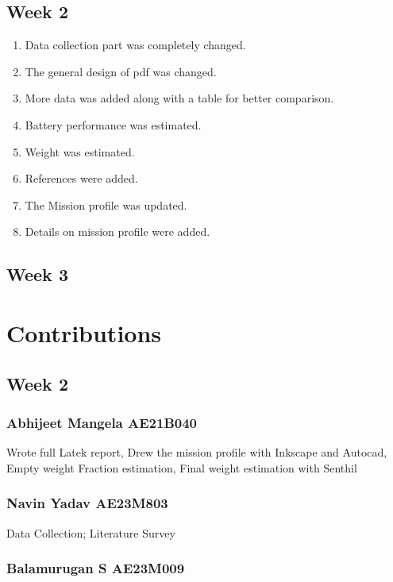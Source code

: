 \documentclass[12 pt]{article}
\begin{document}
\subsection{Week 2}
\begin{enumerate}
    \item Data collection part was completely changed.
    \item The general design of pdf was changed.
    \item More data was added along with a table for better comparison.
    \item Battery performance was estimated.
    \item Weight was estimated.
    \item References were added.
    \item The Mission profile was updated.
    \item Details on mission profile were added.
\end{enumerate}

\subsection{Week 3}

\newpage

\section{Contributions}

\subsection{Week 2}

\subsubsection{Abhijeet Mangela AE21B040}
Wrote full Latek report, Drew the mission profile with Inkscape and Autocad, Empty weight Fraction estimation, Final weight estimation with Senthil

\subsubsection{Navin Yadav AE23M803}

Data Collection; Literature Survey

\subsubsection{Balamurugan S AE23M009}
\end{document}
